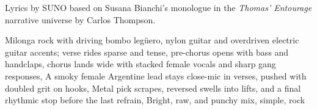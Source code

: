 
\begin{notes}
Lyrics by SUNO based on Susana Bianchi's monologue in the \emph{Thomas’ Entourage} narrative universe by Carlos Thompson.
\end{notes}
\begin{style}
Milonga rock with driving bombo legüero, nylon guitar and overdriven electric guitar accents; verse rides sparse and tense, pre-chorus opens with bass and handclaps, chorus lands wide with stacked female vocals and sharp gang responses, A smoky female Argentine lead stays close-mic in verses, pushed with doubled grit on hooks, Metal pick scrapes, reversed swells into lifts, and a final rhythmic stop before the last refrain, Bright, raw, and punchy mix, simple, rock
\end{style}
